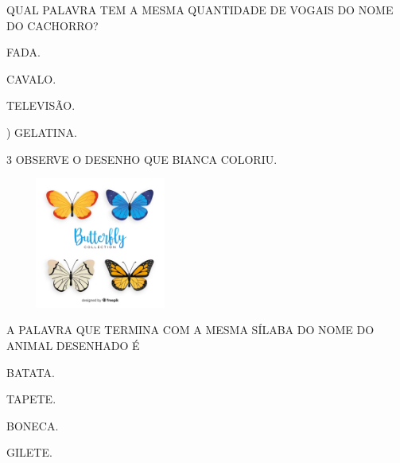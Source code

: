
QUAL PALAVRA TEM A MESMA QUANTIDADE DE VOGAIS DO NOME DO CACHORRO?

\begin{escolha}
\item FADA.

\item CAVALO.

\item TELEVISÃO.

\item) GELATINA.
\end{escolha}


\num{3} OBSERVE O DESENHO QUE BIANCA COLORIU.

\includegraphics[width=2.45833in,height=1.69432in]{media/image227.png}


A PALAVRA QUE TERMINA COM A MESMA SÍLABA DO NOME DO ANIMAL DESENHADO É

\begin{escolha}
\item BATATA.

\item TAPETE.

\item BONECA.

\item GILETE.
\end{escolha}

